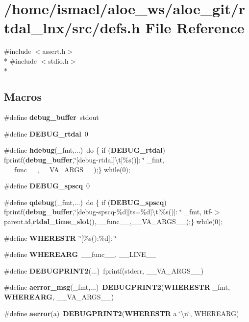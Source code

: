 \section{/home/ismael/aloe\-\_\-ws/aloe\-\_\-git/rtdal\-\_\-lnx/src/defs.h File Reference}
\label{defs_8h}
{\ttfamily \#include $<$assert.\-h$>$}\\*
{\ttfamily \#include $<$stdio.\-h$>$}\\*
\subsection*{Macros}
\begin{DoxyCompactItemize}
\item 
\#define {\bf debug\-\_\-buffer}~stdout
\item 
\#define {\bf D\-E\-B\-U\-G\-\_\-rtdal}~0
\item 
\#define {\bf hdebug}(\-\_\-fmt,...)~do \{ if ({\bf D\-E\-B\-U\-G\-\_\-rtdal}) fprintf({\bf debug\-\_\-buffer},\char`\"{}[debug-\/rtdal]\textbackslash{}t[\%s()]\-: \char`\"{} \-\_\-fmt, \-\_\-\-\_\-func\-\_\-\-\_\-,\-\_\-\-\_\-\-V\-A\-\_\-\-A\-R\-G\-S\-\_\-\-\_\-);\} while(0);
\item 
\#define {\bf D\-E\-B\-U\-G\-\_\-spscq}~0
\item 
\#define {\bf qdebug}(\-\_\-fmt,...)~do \{ if ({\bf D\-E\-B\-U\-G\-\_\-spscq}) fprintf({\bf debug\-\_\-buffer},\char`\"{}[debug-\/spscq-\/\%d][ts=\%d]\textbackslash{}t[\%s()]\-: \char`\"{} \-\_\-fmt, itf-\/$>$parent.\-id,{\bf rtdal\-\_\-time\-\_\-slot}(),\-\_\-\-\_\-func\-\_\-\-\_\-,\-\_\-\-\_\-\-V\-A\-\_\-\-A\-R\-G\-S\-\_\-\-\_\-);\} while(0);
\item 
\#define {\bf W\-H\-E\-R\-E\-S\-T\-R}~\char`\"{}[\%s()\-:\%d]\-: \char`\"{}
\item 
\#define {\bf W\-H\-E\-R\-E\-A\-R\-G}~\-\_\-\-\_\-func\-\_\-\-\_\-, \-\_\-\-\_\-\-L\-I\-N\-E\-\_\-\-\_\-
\item 
\#define {\bf D\-E\-B\-U\-G\-P\-R\-I\-N\-T2}(...)~fprintf(stderr, \-\_\-\-\_\-\-V\-A\-\_\-\-A\-R\-G\-S\-\_\-\-\_\-)
\item 
\#define {\bf aerror\-\_\-msg}(\-\_\-fmt,...)~{\bf D\-E\-B\-U\-G\-P\-R\-I\-N\-T2}({\bf W\-H\-E\-R\-E\-S\-T\-R} \-\_\-fmt, {\bf W\-H\-E\-R\-E\-A\-R\-G}, \-\_\-\-\_\-\-V\-A\-\_\-\-A\-R\-G\-S\-\_\-\-\_\-)
\item 
\#define {\bf aerror}(a)~{\bf D\-E\-B\-U\-G\-P\-R\-I\-N\-T2}({\bf W\-H\-E\-R\-E\-S\-T\-R} a \char`\"{}\textbackslash{}n\char`\"{}, W\-H\-E\-R\-E\-A\-R\-G)

\end{DoxyCompactItemize}
